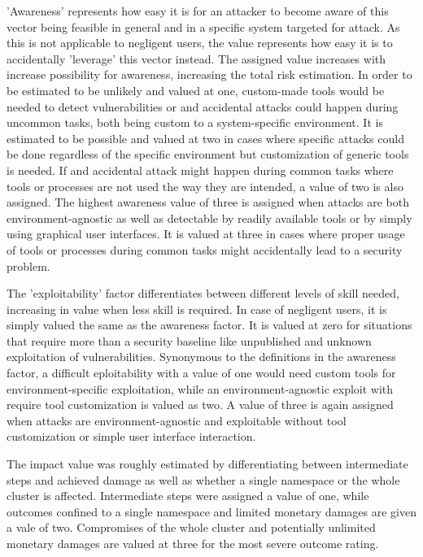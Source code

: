 'Awareness' represents how easy it is for an attacker to become aware of this vector being feasible in general and in a specific system targeted for attack. As this is not applicable to negligent users, the value represents how easy it is to accidentally 'leverage' this vector instead. The assigned value increases with increase possibility for awareness, increasing the total risk estimation.
In order to be estimated to be unlikely and valued at one, custom-made tools would be needed to detect vulnerabilities or and accidental attacks could happen during uncommon tasks, both being custom to a system-specific environment. It is estimated to be possible and valued at two in cases where specific attacks could be done regardless of the specific environment but customization of generic tools is needed. If and accidental attack might happen during common tasks where tools or processes are not used the way they are intended, a value of two is also assigned.
The highest awareness value of three is assigned when attacks are both environment-agnostic as well as detectable by readily available tools or by simply using graphical user interfaces. It is valued at three in cases where proper usage of tools or processes during common tasks might accidentally lead to a security problem.

The 'exploitability' factor differentiates between different levels of skill needed, increasing in value when less skill is required. In case of negligent users, it is simply valued the same as the awareness factor. It is valued at zero for situations that require more than a security baseline like unpublished and unknown exploitation of vulnerabilities. Synonymous to the definitions in the awareness factor, a difficult eploitability with a value of one would need custom tools for environment-specific exploitation, while an environment-agnostic exploit with require tool customization is valued as two. A value of three is again assigned when attacks are environment-agnostic and exploitable without tool customization or simple user interface interaction.

The impact value was roughly estimated by differentiating between intermediate steps and achieved damage as well as whether a single namespace or the whole cluster is affected. Intermediate steps were assigned a value of one, while outcomes confined to a single namespace and limited monetary damages are given a vale of two. Compromises of the whole cluster and potentially unlimited monetary damages are valued at three for the most severe outcome rating.

